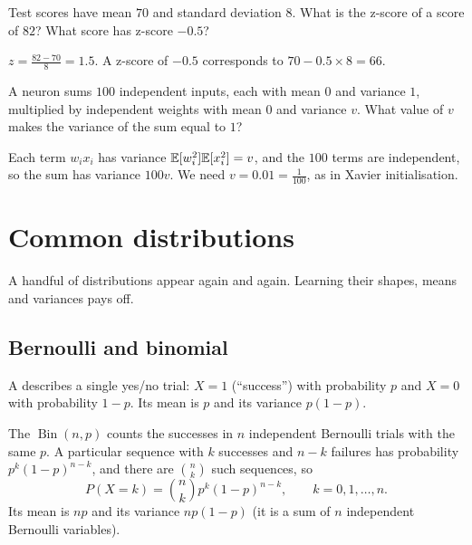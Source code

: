 \begin{exercise}
Test scores have mean $70$ and standard deviation $8$. What is the z-score of a
score of $82$? What score has z-score $-0.5$?
\end{exercise}
\begin{solution}
$z = \tfrac{82 - 70}{8} = 1.5$. A z-score of $-0.5$ corresponds to
$70 - 0.5\times8 = 66$.
\end{solution}

\begin{exercise}
A neuron sums $100$ independent inputs, each with mean $0$ and variance $1$,
multiplied by independent weights with mean $0$ and variance $v$. What value of
$v$ makes the variance of the sum equal to $1$?
\end{exercise}
\begin{solution}
Each term $w_ix_i$ has variance $\mathbb{E}[w_i^2]\mathbb{E}[x_i^2] = v$, and the $100$ terms are
independent, so the sum has variance $100v$. We need $v = 0.01 = \tfrac{1}{100}$,
as in Xavier initialisation.
\end{solution}

\section{Common distributions}\label{sec:distributions}

A handful of distributions appear again and again. Learning their shapes,
means and variances pays off.

\subsection{Bernoulli and binomial}

A  describes a single yes/no trial: $X = 1$
(``success'') with probability $p$ and $X = 0$ with probability $1 - p$. Its mean
is $p$ and its variance $p(1 - p)$.

The  $\operatorname{Bin}(n, p)$ counts the successes
in $n$ independent Bernoulli trials with the same $p$. A particular sequence with
$k$ successes and $n - k$ failures has probability $p^k(1 - p)^{n-k}$, and there
are $\binom nk$ such sequences, so
\[
  P(X = k) = \binom{n}{k}p^k(1 - p)^{n-k}, \qquad k = 0, 1, \dots, n .
\]
Its mean is $np$ and its variance $np(1 - p)$ (it is a sum of $n$ independent
Bernoulli variables).

